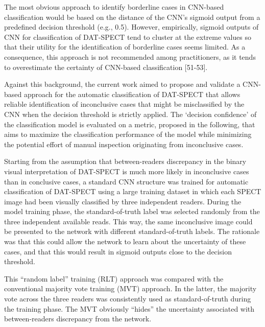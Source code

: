 
The most obvious approach to identify borderline cases in CNN-based classification would be based on the distance of the CNN's sigmoid output from a predefined decision threshold (e.g., 0.5). 
However, empirically, sigmoid outputs of CNN for classification of DAT-SPECT tend to cluster at the extreme values so that their utility for the identification of borderline cases seems limited.  
As a consequence, this approach is not recommended among practitioners, as it tends to overestimate the certainty of CNN-based classification [51-53].


Against this background, the current work aimed to propose and validate a CNN-based approach for the automatic classification of DAT-SPECT 
that allows reliable identification of inconclusive cases that might be misclassified by the CNN when the decision threshold is strictly applied.
The `decision confidence' of the classification model is evaluated on a metric, proposed in the following, 
that aims to maximize the classification performance of the model
while minimizing the potential effort of manual inspection originating from inconclusive cases.

Starting from the assumption that between-readers discrepancy in the binary visual interpretation of DAT-SPECT is much more likely in inconclusive cases 
than in conclusive cases, a standard CNN structure was trained for automatic classification of DAT-SPECT using a large training dataset in which each 
SPECT image had been visually classified by three independent readers. 
During the model training phase, the standard-of-truth label was selected randomly from the three independent available reads. 
This way, the same inconclusive image could be presented to the network with different standard-of-truth labels. 
The rationale was that this could allow the network to learn about the uncertainty of these cases, 
and that this would result in sigmoid outputs close to the decision threshold.

This “random label” training (RLT) approach was compared with the conventional majority vote training (MVT) approach. 
In the latter,  the majority vote across the three readers was consistently used as standard-of-truth during the training phase. 
The MVT obviously “hides” the uncertainty associated with between-readers discrepancy from the network. 

